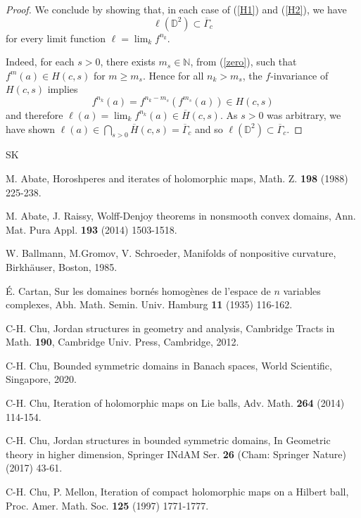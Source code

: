 \documentclass[12pt, twoside]{article}
\theoremstyle{definition}
\numberwithin{equation}{section}
\begin{document}
\begin{proof}
We conclude by showing that, in each case of (\ref{H1}) and (\ref{H2}), we have
$$\ell(\mathbb{D}^2) \subset \overline\Gamma_c$$
for every limit function $\ell= \lim_k f^{n_k}$.

Indeed, for each $s>0$,  there exists $m_s\in \mathbb{N}$, from (\ref{zero}), such that $f^m(a) \in H(c,s)$ for $m \geq m_s$.
Hence for all $n_k > m_s$, the $f$-invariance of $H(c,s)$ implies
$$f^{n_k}(a) = f^{n_k-m_s}(f^{m_s}(a)) \in H(c,s)$$
 and therefore $\ell(a) = \lim_k f^{n_k}(a) \in \overline H(c,s)$.
As $s>0$ was arbitrary, we have shown $\ell(a) \in \bigcap_{s>0} \overline H(c,s) = \overline \Gamma_c$
and so $\ell(\mathbb{D}^2) \subset \overline\Gamma_c$.
\end{proof}


\bigskip

\begin{thebibliography}{SK}
\normalsize
\baselineskip=17pt

 M. Abate,  Horoshperes and iterates of holomorphic
maps,  Math. Z. \textbf{198}  (1988) 225-238.

 M. Abate,  J.  Raissy,  Wolff-Denjoy theorems in nonsmooth convex
domains,  Ann. Mat. Pura Appl. \textbf{193}  (2014) 1503-1518.

   W. Ballmann,  M.Gromov,  V. Schroeder,
{Manifolds of nonpositive curvature}, Birkh\"auser, Boston, 1985.


 \'E. Cartan,     Sur les domaines born\'es homog\`enes de
l'espace de $n$ variables complexes,  Abh. Math. Semin. Univ.
Hamburg \textbf{11}  (1935) 116-162.

 C-H. Chu,   Jordan structures in geometry and
analysis,  Cambridge Tracts in Math. \textbf{190}, Cambridge Univ. Press,
Cambridge, 2012.

 C-H. Chu,    Bounded symmetric domains in Banach
spaces,  World Scientific, Singapore, 2020.

 C-H.  Chu,  Iteration of holomorphic maps on Lie balls,
Adv. Math. \textbf{264} (2014) 114-154.

  C-H. Chu,   Jordan structures in bounded symmetric domains, In
 Geometric theory in higher dimension, Springer INdAM Ser. \textbf{26}
(Cham: Springer Nature)  (2017) 43-61.

 C-H. Chu,  P. Mellon,    Iteration of compact
holomorphic maps on a Hilbert ball,  Proc. Amer. Math. Soc. \textbf{125}
 (1997) 1771-1777.


\end{thebibliography}
\end{document}
